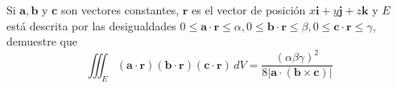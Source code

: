 \item Si $\mathbf{a}, \mathbf{b}$ y $\mathbf{c}$ son vectores constantes, $\mathbf{r}$ es el vector de posición $x\mathbf{i} + y\mathbf{j} + z\mathbf{k}$ y $E$ está descrita por las desigualdades $0 \le \mathbf{a} \cdot \mathbf{r} \le \alpha, 0 \le \mathbf{b} \cdot \mathbf{r} \le \beta, 0 \le \mathbf{c} \cdot \mathbf{r} \le \gamma$, demuestre que
    \[ \iiint_E (\mathbf{a} \cdot \mathbf{r})(\mathbf{b} \cdot \mathbf{r})(\mathbf{c} \cdot \mathbf{r}) \, dV = \frac{(\alpha\beta\gamma)^2}{8|\mathbf{a} \cdot (\mathbf{b} \times \mathbf{c})|} \]
